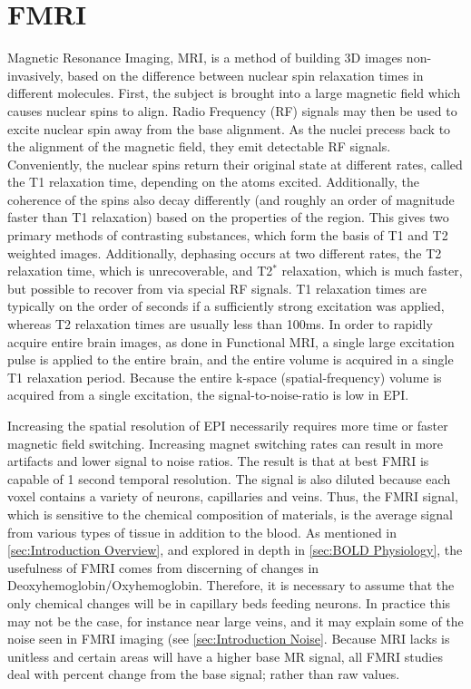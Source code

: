 \section{FMRI}
Magnetic Resonance Imaging, MRI, is a method of building 3D images
non-invasively, based on the difference between nuclear spin
relaxation times in different molecules. First, the subject 
is brought into a large magnetic field which causes nuclear spins
to align. Radio Frequency (RF) signals may
then be used to excite nuclear spin away from the base alignment. 
As the nuclei precess back to the alignment of the magnetic
field, they emit detectable RF signals. Conveniently, the
nuclear spins return their original state at different
rates, called the T1 relaxation time, depending on the atoms excited.
Additionally, the
coherence of the spins also decay differently (and roughly an order of 
magnitude faster
than T1 relaxation) based on the properties of the region.
This gives two primary methods of contrasting substances,
which form the basis of T1 and T2 weighted images. Additionally, 
dephasing occurs at two different rates, the T2 relaxation time,
which is unrecoverable, and T2$^*$ relaxation, which is
much faster, but possible to recover from via special RF signals.
T1 relaxation times are typically on the order of seconds if 
a sufficiently strong excitation was applied, whereas T2 relaxation
times are usually less than 100ms. 
In order to rapidly acquire entire brain images, as done in Functional 
MRI, a single large excitation pulse is applied to the entire brain,
and the entire volume is acquired in a single T1 relaxation period. 
Because the entire k-space (spatial-frequency) volume is acquired 
from a single excitation, the signal-to-noise-ratio is low
in EPI. 

Increasing the spatial resolution of EPI necessarily 
requires more time or faster magnetic field switching. Increasing
magnet switching rates can result in
more artifacts and lower signal to noise ratios. The result is
that at best FMRI is capable of 1 second temporal resolution. 
The signal is also diluted because each voxel contains
a variety of neurons, capillaries and veins. 
Thus, the FMRI signal, which is sensitive to the chemical composition of 
materials, is the average signal from various types of tissue
in addition to the blood. As mentioned in \autoref{sec:Introduction Overview},
and explored in depth in \autoref{sec:BOLD Physiology},
the usefulness of FMRI comes from discerning of changes in 
Deoxyhemoglobin/Oxyhemoglobin. Therefore, it is necessary to assume
that the only chemical changes will be in
capillary beds feeding neurons. In practice this may not be the case, for
instance near large veins, and it may explain some of the
noise seen in FMRI imaging (see \autoref{sec:Introduction Noise}. 
Because MRI lacks is unitless and certain
areas will have a higher base MR signal, all FMRI studies deal with
percent change from the base signal; rather than raw values. 

